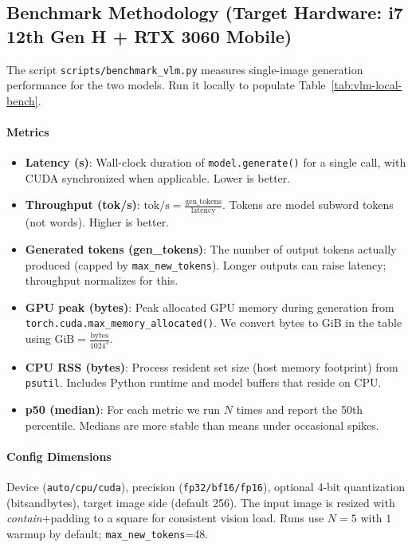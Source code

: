 \documentclass[11pt,a4paper]{article}
\newcommand{\code}[1]{\texttt{#1}}
\begin{document}
\subsection{Benchmark Methodology (Target Hardware: i7 12th Gen H + RTX 3060 Mobile)}
The script \code{scripts/benchmark\_vlm.py} measures single-image generation performance for the two models. Run it locally to populate Table~\ref{tab:vlm-local-bench}.

\paragraph{Metrics}
\begin{itemize}[leftmargin=*]
    \item \textbf{Latency (s)}: Wall-clock duration of \code{model.generate()} for a single call, with CUDA synchronized when applicable. Lower is better.
    \item \textbf{Throughput (tok/s)}: $\text{tok/s}=\tfrac{\text{gen\_tokens}}{\text{latency}}$. Tokens are model subword tokens (not words). Higher is better.
    \item \textbf{Generated tokens (gen\_tokens)}: The number of output tokens actually produced (capped by \code{max\_new\_tokens}). Longer outputs can raise latency; throughput normalizes for this.
    \item \textbf{GPU peak (bytes)}: Peak allocated GPU memory during generation from \code{torch.cuda.max\_memory\_allocated()}. We convert bytes to GiB in the table using $\text{GiB}=\tfrac{\text{bytes}}{1024^3}$.
    \item \textbf{CPU RSS (bytes)}: Process resident set size (host memory footprint) from \code{psutil}. Includes Python runtime and model buffers that reside on CPU.
    \item \textbf{p50 (median)}: For each metric we run $N$ times and report the 50th percentile. Medians are more stable than means under occasional spikes.
\end{itemize}

\paragraph{Config Dimensions}
Device (\code{auto/cpu/cuda}), precision (\code{fp32/bf16/fp16}), optional 4-bit quantization (bitsandbytes), target image side (default 256). The input image is resized with \emph{contain}+padding to a square for consistent vision load. Runs use $N=5$ with $1$ warmup by default; \code{max\_new\_tokens}=48.
\end{document}
